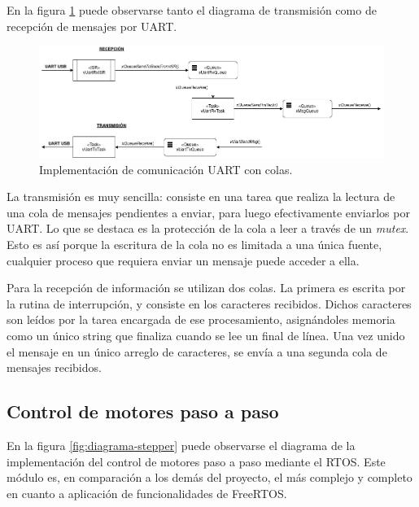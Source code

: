 \documentclass{IEEEtran}
\begin{document}
En la figura \ref{fig:diagrama-uart} puede observarse tanto el diagrama de transmisión como de recepción de mensajes por UART.

\begin{figure}[ht]
    \centering
    \includegraphics[scale=0.5]{../diagrama_uart.png}
    \caption{Implementación de comunicación UART con colas.}
    \label{fig:diagrama-uart}
\end{figure}

La transmisión es muy sencilla: consiste en una tarea que realiza la lectura de una cola de mensajes pendientes a enviar, para luego efectivamente enviarlos por UART. Lo que se destaca es la protección de la cola a leer a través de un \textit{mutex}. Esto es así porque la escritura de la cola no es limitada a una única fuente, cualquier proceso que requiera enviar un mensaje puede acceder a ella.

Para la recepción de información se utilizan dos colas. La primera es escrita por la rutina de interrupción, y consiste en los caracteres recibidos. Dichos caracteres son leídos por la tarea encargada de ese procesamiento, asignándoles memoria como un único string que finaliza cuando se lee un final de línea. Una vez unido el mensaje en un único arreglo de caracteres, se envía a una segunda cola de mensajes recibidos.

\subsection{Control de motores paso a paso}
\label{sec:stepper}

En la figura \ref{fig:diagrama-stepper} puede observarse el diagrama de la implementación del control de motores paso a paso mediante el RTOS. Este módulo es, en comparación a los demás del proyecto, el más complejo y completo en cuanto a aplicación de funcionalidades de FreeRTOS.
\end{document}
